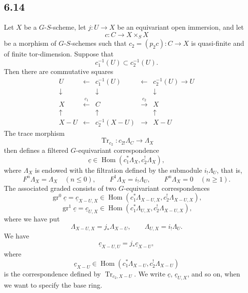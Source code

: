 \documentclass[11pt]{article}
\DeclareMathOperator{\Hom}{Hom}
\providecommand{\Tr}{\operatorname{Tr}}
\providecommand{\Tr}{\operatorname{Tr}}
\providecommand{\Tr}{\operatorname{Tr}}
\providecommand{\Hom}{\operatorname{Hom}}
\providecommand{\Tr}{\operatorname{Tr}}
\providecommand{\Hom}{\operatorname{Hom}}
\providecommand{\Tr}{\operatorname{Tr}}
\begin{document}
\subsection*{6.14}
Let $X$ be a $G$-$S$-scheme, let $j:U\to X$ be an equivariant open immersion, and let
\[
c:C\to X\times_SX
\]
be a morphism of $G$-$S$-schemes such that $c_2=(p_2c):C\to X$ is quasi-finite and of finite tor-dimension. Suppose that
\[
c_1^{-1}(U)\subset c_2^{-1}(U).
\]
Then there are commutative squares
\begin{equation}
\begin{array}{ccccc}
U & \longleftarrow & c_1^{-1}(U) & \longleftarrow & c_2^{-1}(U)\longrightarrow U\\
\downarrow && \downarrow && \downarrow\\
X & \xleftarrow{\,c_1\,} & C & \xrightarrow{\,c_2\,} & X\\
\uparrow && \uparrow && \uparrow\\
X-U & \longleftarrow & c_2^{-1}(X-U) & \longrightarrow & X-U
\end{array}
\tag{6.14.1}
\end{equation}
The trace morphism
\[
\Tr_{c_2}:c_{2!}\Lambda_C\longrightarrow \Lambda_X
\]
then defines a filtered $G$-equivariant correspondence
\begin{equation}
\underline c\in\Hom(c_1^*\Lambda_X,c_2^!\Lambda_X),
\tag{6.14.2}
\end{equation}
where $\Lambda_X$ is endowed with the filtration defined by the submodule $i_!\Lambda_U$, that is,
\[
F^n\Lambda_X=\Lambda_X\quad(n\le0),\qquad
F^1\Lambda_X=i_!\Lambda_U,\qquad
F^n\Lambda_X=0\quad(n\ge1).
\]
The associated graded consists of two $G$-equivariant correspondences
\[
\operatorname{gr}^0\underline c=\underline c_{X-U,X}
\in\Hom(c_1^*\Lambda_{X-U,X},c_2^!\Lambda_{X-U,X}),
\]
\begin{equation}
\operatorname{gr}^1\underline c=\underline c_{U,X}
\in\Hom(c_1^*\Lambda_{U,X},c_2^!\Lambda_{X-U,X}),
\tag{6.14.3}
\end{equation}
where we have put
\[
\Lambda_{X-U,X}=j_*\Lambda_{X-U},\qquad
\Lambda_{U,X}=i_!\Lambda_U.
\]
We have
\begin{equation}
\underline c_{X-U,U}=j_*\underline c_{X-U},
\tag{6.14.4}
\end{equation}
where
\[
\underline c_{X-U}\in\Hom(c_1^*\Lambda_{X-U},c_2^!\Lambda_{X-U})
\]
is the correspondence defined by $\Tr_{c_2,X-U}$. We write $\underline c$, $\underline c_{U,X}$, and so on, when we want to specify the base ring.
\end{document}
